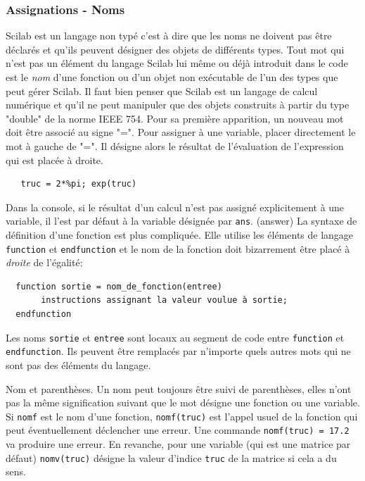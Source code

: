 \subsubsection{Assignations - Noms}
Scilab est un langage non typé c'est à dire que les noms ne doivent pas être déclarés et qu'ils peuvent désigner des objets de différents types. 
Tout mot qui n'est pas un élément du langage Scilab lui même ou déjà introduit dans le code est le \emph{nom} d'une fonction ou d'un objet non exécutable de l'un des types que peut gérer Scilab. Il faut bien penser que Scilab est un langage de calcul numérique et qu'il ne peut manipuler que des objets construits à partir du type "double" de la norme IEEE 754.\newline
Pour sa première apparition, un nouveau mot doit être associé au signe "=".\newline
Pour assigner à une variable, placer directement le mot à gauche de "=". Il désigne alors le résultat de l'évaluation de l'expression qui est placée à droite.
\begin{verbatim}
   truc = 2*%pi; exp(truc)
\end{verbatim}
Dans la console, si le résultat d'un calcul n'est pas assigné explicitement à une variable, il l'est par défaut à la variable désignée par \texttt{ans}. (answer)\newline
La syntaxe de définition d'une fonction est plus compliquée. Elle utilise les éléments de langage \texttt{function} et \texttt{endfunction} et le nom de la fonction doit bizarrement être placé à \emph{droite} de l'égalité:
\begin{verbatim}
  function sortie = nom_de_fonction(entree)
       instructions assignant la valeur voulue à sortie;
  endfunction
\end{verbatim}
Les noms \texttt{sortie} et \texttt{entree} sont locaux au segment de code entre \texttt{function} et \texttt{endfunction}. Ils peuvent être remplacés par n'importe quels autres mots qui ne sont pas des éléments du langage.

Nom et parenthèses. Un nom peut toujours être suivi de parenthèses, elles n'ont pas la même signification suivant que le mot désigne une fonction ou une variable.  Si \texttt{nomf} est le nom d'une fonction, \texttt{nomf(truc)} est l'appel usuel de la fonction qui peut éventuellement déclencher une erreur. Une commande \texttt{nomf(truc) = 17.2} va produire une erreur. En revanche, pour une variable (qui est une matrice par défaut) \texttt{nomv(truc)} désigne la valeur d'indice \texttt{truc} de la matrice si cela a du sens.


